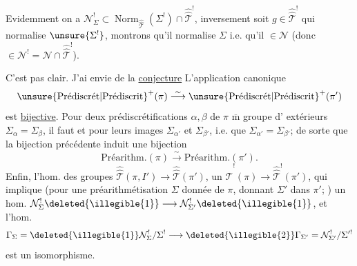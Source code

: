 Evidemment on a
$\mathcal N^{!}_{\Sigma}\subset
\operatorname{Norm}_{\widehat{\widehat{\mathcal T}}}(\Sigma^{!})\cap
\widehat{\widehat{\mathcal T}}^{!}$,
inversement soit $g\in\widehat{\widehat{\mathcal T}}^{!}$ qui normalise
$\unsure{\Sigma^{!}}$, montrons qu'il normalise $\Sigma$ i.e.
qu'il  $\in\mathcal N$
(donc $\in\mathcal N^{!}=\mathcal N\cap\widehat{\widehat{\mathcal T}}^{!}$).


C'est pas clair. J'ai  envie de   la
\uline{conjecture} L'application canonique
\[
\unsure{\text{Prédiscrét}|\text{Prédiscrit}}^{+}(\pi)
 \overset{\sim}{\longrightarrow}
\unsure{\text{Prédiscrét}|\text{Prédiscrit}}^{+}(\pi')
\]
est \uline{bijective}. Pour  deux prédiscrétifications 
$\alpha,\beta$ de $\pi$  $\overline{\mathrm m}$ groupe d' extérieurs
$\Sigma_\alpha=\Sigma_\beta$,  il faut et 
 
pour leurs images $\Sigma_{\alpha'}$ et $\Sigma_{\beta'}$, i.e. que
$\Sigma_{\alpha'}=\Sigma_{\beta'}$; de sorte que la bijection précédente induit une bijection
\[
\text{Préarithm.}(\pi)\overset{\sim}{\longrightarrow}\text{Préarithm.}(\pi').
\]
Enfin, 
l'hom. des groupes 
$\widehat{\widehat{\mathcal T}}(\pi,I')\longrightarrow\widehat{\widehat{\mathcal T}}(\pi')$,
 
un $\widehat{\widehat{\mathcal T}}^{!}(\pi)\longrightarrow\widehat{\widehat{\mathcal T}}^{!}(\pi')$,
 qui implique 
(pour une préarithmétisation $\Sigma$ 
donnée de $\pi$, donnant $\Sigma'$ 
dans $\pi'$; ) un
hom.
$\mathcal N_\Sigma^{!}\deleted{\illegible{1}}\longrightarrow
\mathcal N_{\Sigma'}^{!}\deleted{\illegible{1}}$,
 et l'hom. 
\[
\Gamma_\Sigma=\deleted{\illegible{1}}\mathcal N_\Sigma^{!}/\Sigma^{!}
 \longrightarrow
\deleted{\illegible{2}}\Gamma_{\Sigma'}=\mathcal N_{\Sigma'}^{!}/\Sigma'^{!}
\]
est un isomorphisme.

